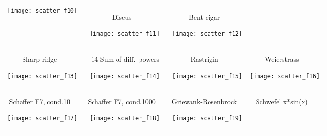 \documentclass{sig-alternate}
\begin{document}
\begin{figure*}
\begin{tabular}{*{4}{@{}c@{}}}
    \texttt{[image: scatter\_f10]}&
\begin{turn}{90}\parbox{0.21\textwidth}{\hfill{} Discus \hfill~}\end{turn} 
    \texttt{[image: scatter\_f11]}&
\begin{turn}{90}\parbox{0.21\textwidth}{\hfill{} Bent cigar \hfill~}\end{turn} 
    \texttt{[image: scatter\_f12]}\\[-2.2ex]
\begin{turn}{90}\parbox{0.21\textwidth}{\hfill{} Sharp ridge \hfill~}\end{turn} 
    \texttt{[image: scatter\_f13]}&
\begin{turn}{90}\parbox{0.21\textwidth}{\hfill\sf~~14 Sum of diff.\ powers \hfill~}\end{turn} 
    \texttt{[image: scatter\_f14]}&
\begin{turn}{90}\parbox{0.21\textwidth}{\hfill{} Rastrigin \hfill~}\end{turn} 
    \texttt{[image: scatter\_f15]}&
\begin{turn}{90}\parbox{0.21\textwidth}{\hfill{} Weierstrass \hfill~}\end{turn} 
    \texttt{[image: scatter\_f16]}\\[-2.2ex]
\begin{turn}{90}\parbox{0.21\textwidth}{\hfill{} Schaffer F7, cond.10 \hfill~}\end{turn} 
    \texttt{[image: scatter\_f17]}&
\begin{turn}{90}\parbox{0.21\textwidth}{\hfill{} Schaffer F7, cond.1000 \hfill~}\end{turn} 
    \texttt{[image: scatter\_f18]}&
\begin{turn}{90}\parbox{0.21\textwidth}{\hfill{} Griewank-Rosenbrock \hfill~}\end{turn} 
    \texttt{[image: scatter\_f19]}&
\begin{turn}{90}\parbox{0.21\textwidth}{\hfill{} Schwefel x*sin(x) \hfill~}\end{turn} 

\end{tabular}
\end{figure*}
\end{document}

